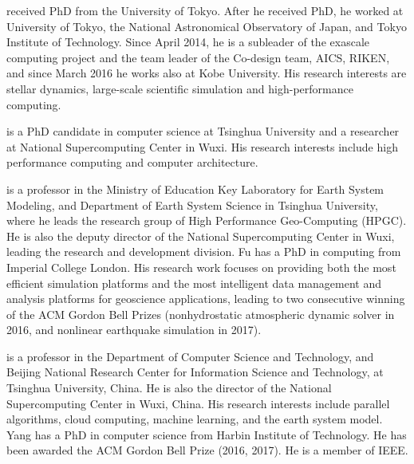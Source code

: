 \documentclass[Afour,sageh,times]{sagej}
\begin{document}
\begin{biogs}
   received PhD from the University of
  Tokyo. After he received PhD, he worked at University of Tokyo, the
  National Astronomical Observatory of Japan, and Tokyo Institute of
  Technology. Since April 2014, he is a subleader of the exascale
  computing project and the team leader of the Co-design team, AICS,
  RIKEN, and since March 2016 he works also at Kobe University. His
  research interests are stellar dynamics, large-scale scientific
  simulation and high-performance computing.

   is a PhD candidate in computer science at
  Tsinghua University and a researcher at National Supercomputing
  Center in Wuxi. His research interests include high performance
  computing and computer architecture.

   is a professor in the Ministry of
  Education Key Laboratory for Earth System Modeling, and Department
  of Earth System Science in Tsinghua University, where he leads the
  research group of High Performance Geo-Computing (HPGC). He is also
  the deputy director of the National Supercomputing Center in Wuxi,
  leading the research and development division. Fu has a PhD in
  computing from Imperial College London. His research work focuses on
  providing both the most efficient simulation platforms and the most
  intelligent data management and analysis platforms for geoscience
  applications, leading to two consecutive winning of the ACM Gordon
  Bell Prizes (nonhydrostatic atmospheric dynamic solver in 2016, and
  nonlinear earthquake simulation in 2017).

  
   is a professor in the Department of
  Computer Science and Technology, and Beijing National Research
  Center for Information Science and Technology, at Tsinghua
  University, China. He is also the director of the National
  Supercomputing Center in Wuxi, China. His research interests include
  parallel algorithms, cloud computing, machine learning, and the
  earth system model. Yang has a PhD in computer science from Harbin
  Institute of Technology. He has been awarded the ACM Gordon Bell
  Prize (2016, 2017). He is a member of IEEE.
  
\end{biogs}





\end{document}
